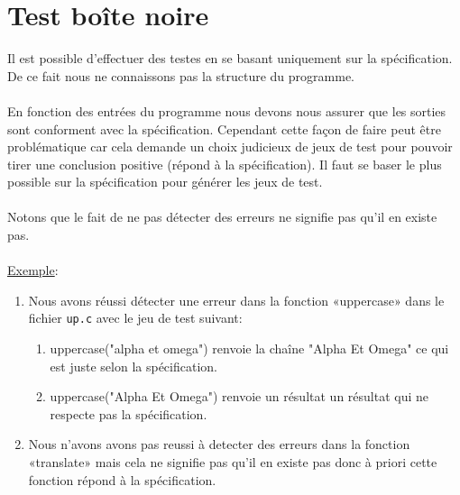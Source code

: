 \documentclass{article}
\begin{document}
\section{Test boîte noire}
 
Il est possible d'effectuer des testes en se basant uniquement sur la spécification. De ce fait nous ne connaissons pas la structure du programme.
\\
\\ 
En fonction des entrées du programme nous devons nous assurer que les sorties sont conforment avec la spécification. Cependant cette façon de faire peut être problématique car cela demande un choix judicieux de jeux de test pour pouvoir tirer une conclusion positive (répond à la spécification). Il faut se baser le plus possible sur la spécification pour générer les jeux de test. 
\\
\\
Notons que le fait de ne pas détecter des erreurs ne signifie pas qu'il en existe pas.
\\
\\
\underline{Exemple}:
\begin{enumerate} 
 \item Nous avons réussi  détecter une erreur dans la fonction «uppercase» dans le fichier \texttt{up.c} avec le jeu de test suivant:
   \begin{enumerate}
               \item uppercase("alpha et omega") renvoie la chaîne "Alpha Et Omega" ce qui est juste selon la spécification.
 
         \item uppercase("Alpha Et Omega") renvoie un résultat un résultat qui ne respecte pas la spécification.
\end{enumerate}

   \item Nous n'avons avons pas reussi à detecter des erreurs dans la fonction «translate» mais cela ne signifie pas qu'il en existe pas donc à priori cette fonction répond à la spécification.
\end{enumerate}
\end{document}
